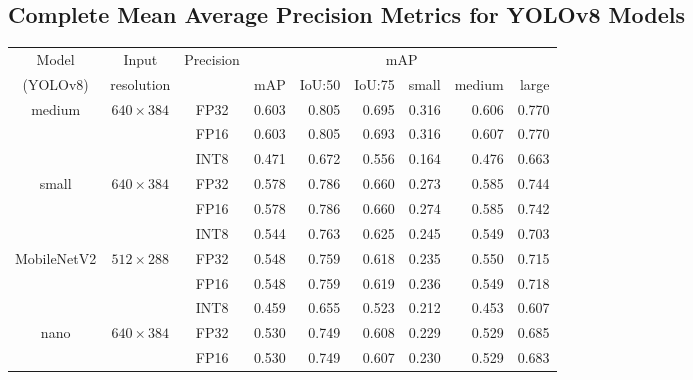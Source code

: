 \begin{appendices}
\chapter{Complete Mean Average Precision Metrics for YOLOv8 Models}
\label{mAPTableBig}
\begin{table}[t]
    \centering
    \small
    \begin{tabular}{|c|c|c|rrrrrr|}
        \hline
        Model & Input & \multirow{2}{*}{Precision} &  \multicolumn{6}{c|}{mAP} \\
        \cline{4-9}
        (YOLOv8)                     & resolution                      &      & mAP   & IoU:50& IoU:75& small & medium& large \\
        \hline
        \hline
        \multirow{3}{*}{medium}     & \multirow{3}{*}{$640\times384$}  & FP32 & 0.603 & 0.805 & 0.695 & 0.316 & 0.606 & 0.770 \\
                                    &                                  & FP16 & 0.603 & 0.805 & 0.693 & 0.316 & 0.607 & 0.770 \\
                                    &                                  & INT8 & 0.471 & 0.672 & 0.556 & 0.164 & 0.476 & 0.663 \\
        \hline                                                           
        \multirow{3}{*}{small}      & \multirow{3}{*}{$640\times384$}  & FP32 & 0.578 & 0.786 & 0.660 & 0.273 & 0.585 & 0.744 \\
                                    &                                  & FP16 & 0.578 & 0.786 & 0.660 & 0.274 & 0.585 & 0.742 \\
                                    &                                  & INT8 & 0.544 & 0.763 & 0.625 & 0.245 & 0.549 & 0.703 \\
        \hline
        \multirow{3}{*}{MobileNetV2}& \multirow{3}{*}{$512\times288$}  & FP32 & 0.548 & 0.759 & 0.618 & 0.235 & 0.550 & 0.715 \\
                                    &                                  & FP16 & 0.548 & 0.759 & 0.619 & 0.236 & 0.549 & 0.718 \\
                                    &                                  & INT8 & 0.459 & 0.655 & 0.523 & 0.212 & 0.453 & 0.607 \\
        \hline                      
        \multirow{9}{*}{nano}       & \multirow{3}{*}{$640\times384$}  & FP32 & 0.530 & 0.749 & 0.608 & 0.229 & 0.529 & 0.685 \\
                                    &                                  & FP16 & 0.530 & 0.749 & 0.607 & 0.230 & 0.529 & 0.683 \\

\end{tabular}
\end{table}
\end{appendices}
